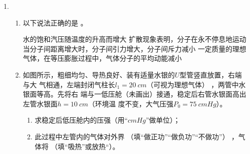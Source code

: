 \begin{enumerate}
\begin{enumerate}



\end{enumerate}



\item 
{}
\begin{enumerate}
	\item
以下说法正确的是
 \underlinegap 。

\fourchoices
{水的饱和汽压随温度的升高而增大}
{扩散现象表明，分子在永不停息地运动}
{当分子间距离增大时，分子间引力增大，分子间斥力减小}
{一定质量的理想气体，在等压膨胀过程中，气体分子的平均动能减小}


\item 
如图所示，粗细均匀、导热良好、装有适量水银的$ U $型管竖直放置，右端与大
气相通，左端封闭气柱长$ l_{1} =20 \ cm $（可视为理想气体）
，两管中水银面等高。先将右
端与一低压舱（未画出）接通，稳定后右管水银面高出左管水银面$ h=10 \ cm $（环境温
度不变，大气压强$ P_{0} =75 \ cm Hg $）。
\begin{enumerate}
	\item
求稳定后低压舱内的压强（用“$ cmHg $”做单位）；
\item 
此过程中左管内的气体对外界 \underlinegap （填“做正功”“做负功”“不做功”）
，气体将 \underlinegap （填“吸热”或放热“）。
\end{enumerate}


\end{enumerate}
\end{enumerate}
